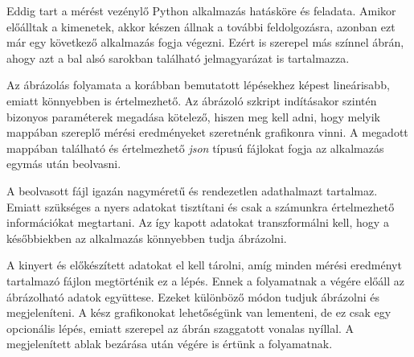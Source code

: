 Eddig tart a mérést vezénylő Python alkalmazás hatásköre és feladata.
Amikor előálltak a kimenetek, akkor készen állnak a további feldolgozásra, azonban ezt már egy következő alkalmazás fogja végezni.
Ezért is szerepel más színnel  ábrán, ahogy azt a bal alsó sarokban található jelmagyarázat is tartalmazza.

Az ábrázolás folyamata a korábban bemutatott lépésekhez képest lineárisabb, emiatt könnyebben is értelmezhető.
Az ábrázoló szkript indításakor szintén bizonyos paraméterek megadása kötelező, hiszen meg kell adni, hogy melyik mappában szereplő mérési eredményeket szeretnénk grafikonra vinni.
A megadott mappában található és értelmezhető \textit{json} típusú fájlokat fogja az alkalmazás egymás után beolvasni.

A beolvasott fájl igazán nagyméretű és rendezetlen adathalmazt tartalmaz.
Emiatt szükséges a nyers adatokat tisztítani és csak a számunkra értelmezhető információkat megtartani.
Az így kapott adatokat transzformálni kell, hogy a későbbiekben az alkalmazás könnyebben tudja ábrázolni.

A kinyert és előkészített adatokat el kell tárolni, amíg minden mérési eredményt tartalmazó fájlon megtörténik ez a lépés. 
Ennek a folyamatnak a végére előáll az ábrázolható adatok együttese.
Ezeket különböző módon tudjuk ábrázolni és megjeleníteni.
A kész grafikonokat lehetőségünk van lementeni, de ez csak egy opcionális lépés, emiatt szerepel az ábrán szaggatott vonalas nyíllal.
A megjelenített ablak bezárása után végére is értünk a folyamatnak.

